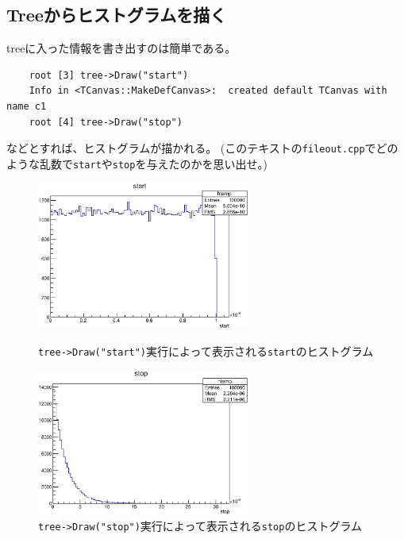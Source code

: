   \subsection{Treeからヒストグラムを描く}
  treeに入った情報を書き出すのは簡単である。
\begin{verbatim}
	root [3] tree->Draw("start")
	Info in <TCanvas::MakeDefCanvas>:  created default TCanvas with name c1
	root [4] tree->Draw("stop")
\end{verbatim}
などとすれば、ヒストグラムが描かれる。
(このテキストの\verb|fileout.cpp|でどのような乱数で\verb|start|や\verb|stop|を与えたのかを思い出せ。)

\begin{figure}[htbp]
 \begin{minipage}{0.45\hsize}
  \begin{center}
   \includegraphics[width = 70mm]{./picture/meettreecanvas1.eps}
  \end{center}
  \caption{\texttt{tree->Draw("start")}実行によって表示される\texttt{start}のヒストグラム}
  \label{Fig:meettreecanvas1}
 \end{minipage}
 \begin{minipage}{0.45\hsize}
  \begin{center}
   \includegraphics[width = 70mm]{./picture/meettreecanvas2.eps}
  \end{center}
  \caption{\texttt{tree->Draw("stop")}実行によって表示される\texttt{stop}のヒストグラム}
  \label{Fig:meettreecanvas2}
 \end{minipage}
\end{figure}


